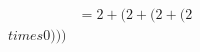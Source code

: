 \documentclass[preview]{standalone}
\begin{document}
\begin{align*}
&= 2 + (2 + (2 + (2 \\times 0))) \\
\end{align*}
\end{document}
